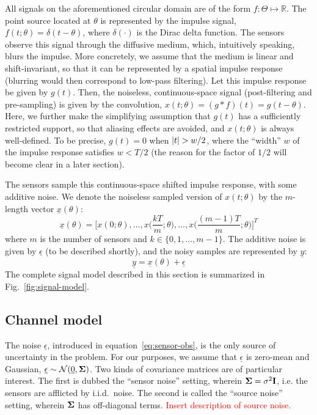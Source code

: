 \documentclass[conference]{IEEEtran}
\providecommand{\v}{}
\renewcommand{\v}[1]{\underline{#1}}
\providecommand{\m}{}
\renewcommand{\m}[1]{{\bf #1}}
\DeclarePairedDelimiter\abs{\lvert}{\rvert}
\begin{document}
All signals on the aforementioned circular domain are of the form
$f:\Theta\mapsto\mathbb{R}$.  The point source located at $\theta$ is
represented by the impulse signal, $f(t;\theta) = \delta(t - \theta)$, where
$\delta(\cdot)$ is the Dirac delta function.  The sensors observe this signal
through the diffusive medium, which, intuitively speaking, blurs the impulse.
More concretely, we assume that the medium is linear and shift-invariant, so
that it can be represented by a spatial impulse response (blurring would then
correspond to low-pass filtering). Let this impulse response be given by
$g(t)$. Then, the noiseless, continuous-space signal (post-filtering and
pre-sampling) is given by the convolution, $x(t; \theta) = (g*f)(t) = g(t -
\theta)$. Here, we further make the simplifying assumption that $g(t)$ has a
sufficiently restricted support, so that aliasing effects are avoided, and
$x(t; \theta)$ is always well-defined. To be precise, $g(t) = 0$ when $\abs{t}
> w/2$, where the ``width'' $w$ of the impulse response satisfies $w < T / 2$
(the reason for the factor of $1/2$ will become clear in a later section).

The sensors sample this continuous-space shifted impulse response, with some
additive noise. We denote the noiseless sampled version of $x(t; \theta)$ by
the $m$-length vector $\v x(\theta)$:
\begin{equation} \label{eq:sampled-signal}
	\v x(\theta) = \bigg[x(0; \theta), \ldots, x\Big(\frac{kT}{m}; \theta\Big), \ldots, x\Big(\frac{(m-1)T}{m}; \theta\Big)\bigg]^T
\end{equation}
where $m$ is the number of sensors and $k \in \{0, 1, \ldots, m-1\}$. The
additive noise is given by $\v \epsilon$ (to be described shortly), and the
noisy samples are represented by $\v y$:
\begin{equation} \label{eq:sensor-obs}
	\v y = \v x(\theta) + \v \epsilon
\end{equation}
The complete signal model described in this section is summarized in
Fig.~\ref{fig:signal-model}.

\subsection{Channel model}
\label{sec:channel-model}

The noise $\v \epsilon$, introduced in equation~\eqref{eq:sensor-obs}, is
the only source of uncertainty in the problem. For our purposes, we assume that
$\v \epsilon$ is zero-mean and Gaussian, $\v \epsilon \sim \mathcal{N}(\v 0, \m
\Sigma)$. Two kinds of covariance matrices are of particular interest. The
first is dubbed the ``sensor noise'' setting, wherein $\m\Sigma = \sigma^2 \m
I$, i.e. the sensors are afflicted by i.i.d.\ noise. The second is called the
``source noise'' setting, wherein $\m\Sigma$ has off-diagonal terms.
\textcolor{red}{Insert description of source noise.}
\end{document}
